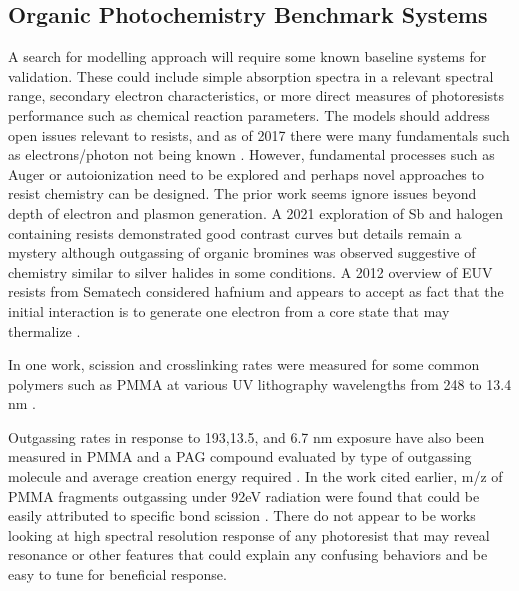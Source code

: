 \subsection{ Organic Photochemistry Benchmark Systems }
A search for modelling approach will require some known
baseline systems for validation. These could include simple absorption
spectra in a relevant spectral range, secondary electron characteristics,
or more direct measures of photoresists performance such as 
chemical reaction parameters. 
The models should address open issues relevant to resists,
and as of 2017 there were many fundamentals such as electrons/photon
not being known
\cite{AmritNarasimhan2017}. However, fundamental processes
such as Auger or autoionization need to be explored and perhaps
novel approaches to resist chemistry can be designed. The prior work
seems ignore issues beyond depth of electron and plasmon generation. 
A 2021 exploration of Sb and halogen containing resists demonstrated good contrast
curves but details remain a mystery although outgassing of organic
bromines was observed \cite{MichaelMurphy2021} suggestive of
chemistry similar to silver halides in some conditions.
A 2012 overview of EUV resists from Sematech  considered hafnium and appears to
accept as fact that the initial interaction is to generate one electron
from a core state that may thermalize \cite{NeisserMark2012}.


In one work, scission and crosslinking rates were measured for some common
polymers such as PMMA at various UV lithography wavelengths
from 248 to 13.4 nm \cite{RobertDAllen_Polymer_photochemistry_2010}.

Outgassing rates in response to 193,13.5, and 6.7 nm
exposure have also been measured in PMMA and a PAG compound
evaluated by type of outgassing molecule and average creation
energy required \cite{HO2018306}.
In the work cited earlier, m/z of PMMA fragments outgassing under 92eV
radiation were found that could be easily attributed to specific bond
scission 
\cite{DouglasGuerreroadditionalGillesRAmblard_Dissociative_photoionization_2023}.
There do not appear to be works looking at high spectral resolution
response of any photoresist that may reveal resonance or other features
that could explain any confusing behaviors and be easy to tune
for beneficial response.

